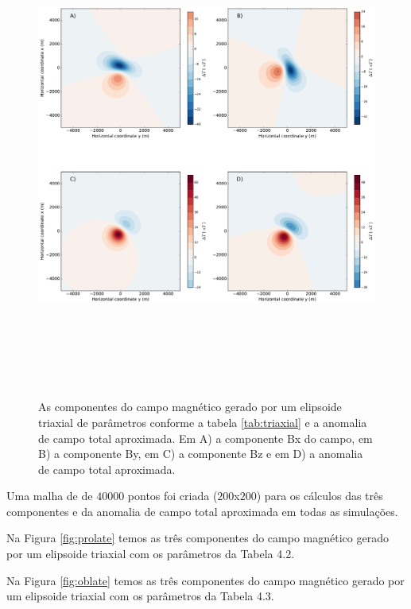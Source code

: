 \begin{figure}[hbt!]
	\centering \includegraphics[width=16cm,height=16cm]{figures/ellipsoid_triaxial}
	\caption[As componentes do campo magnético gerado por um elipsoide triaxial e a anomalia de campo total aproximada.]{As componentes 
		do campo magnético gerado por um elipsoide triaxial de parâmetros conforme a tabela \ref{tab:triaxial} e a anomalia de campo total aproximada. Em A) a componente Bx do campo, em B) a componente By, em C) a componente Bz e em D) a anomalia de campo total aproximada.}
	\label{fig:triaxial}
\end{figure}

Uma malha de de $40000$ pontos foi criada ($200$x$200$) para os cálculos das três componentes e da anomalia de campo total aproximada em todas as simulações.

Na Figura \ref{fig:prolate} temos as três componentes do campo magnético gerado por um elipsoide triaxial com os parâmetros da Tabela 4.2.

Na Figura \ref{fig:oblate} temos as três componentes do campo magnético gerado por um elipsoide triaxial com os parâmetros da Tabela 4.3.
\\\\\\

